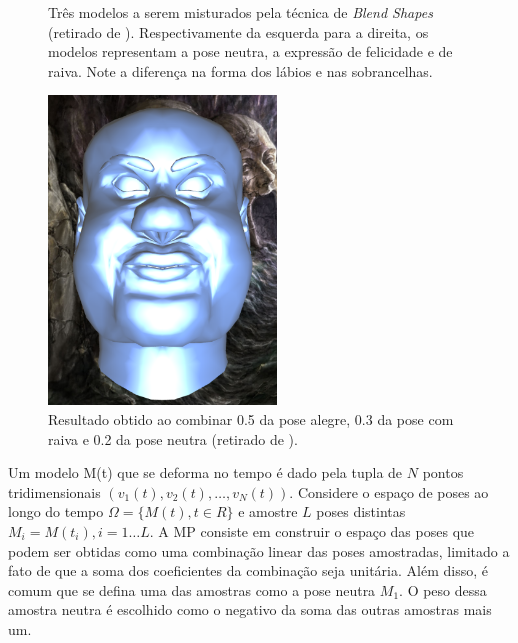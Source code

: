 {\begin{figure}[!htb]
\caption{Três modelos a serem misturados pela técnica de \textit{Blend Shapes}
(retirado de \cite{tutorial-supremo-on-blend-shapes}). Respectivamente da
esquerda para a direita, os modelos representam a pose neutra, a expressão de
felicidade e de raiva. Note a diferença na forma dos lábios e nas sobrancelhas.}

\label{fig:blend-shapes-example-input} 
\end{figure}

\begin{figure}[!htb]
   \centering
  \includegraphics[width=0.6\linewidth]{./figs/outputOfBlendShapes.png}

\caption{Resultado obtido ao combinar 0.5 da pose alegre, 0.3 da pose com raiva e 0.2 da pose neutra (retirado de \cite{tutorial-supremo-on-blend-shapes}).}

\label{fig:blend-shapes-example-output} 
\end{figure}

    
    Um modelo M(t) que se deforma no tempo é dado pela tupla de $N$ pontos
    tridimensionais $ ( v_1(t), v_2(t), \ldots,  v_N(t))$. Considere o espaço de
    poses ao longo do tempo $\Omega = \{ M(t), t \in R\}$  e amostre $L$ poses
    distintas $M_i = M(t_i), i = 1 \ldots L$. A MP consiste em construir o
    espaço das poses que podem ser obtidas como uma combinação linear das poses
    amostradas, limitado a fato de que a soma dos coeficientes da combinação
    seja unitária. Além disso, é comum que se defina uma das amostras como a
    pose neutra $M_1$. O peso dessa amostra neutra é escolhido como o negativo
    da soma das outras amostras mais um.
    
}
